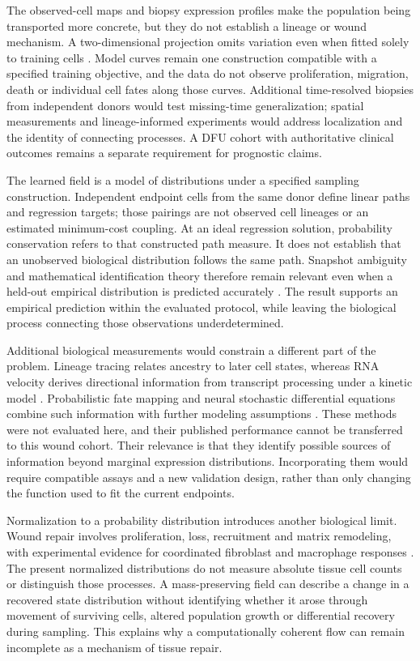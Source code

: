 The observed-cell maps and biopsy expression profiles make the population being transported more concrete, but they do not establish a lineage or wound mechanism. A two-dimensional projection omits variation even when fitted solely to training cells \citep{huang2022visualization}. Model curves remain one construction compatible with a specified training objective, and the data do not observe proliferation, migration, death or individual cell fates along those curves. Additional time-resolved biopsies from independent donors would test missing-time generalization; spatial measurements and lineage-informed experiments would address localization and the identity of connecting processes. A DFU cohort with authoritative clinical outcomes remains a separate requirement for prognostic claims.

The learned field is a model of distributions under a specified sampling construction. Independent endpoint cells from the same donor define linear paths and regression targets; those pairings are not observed cell lineages or an estimated minimum-cost coupling. At an ideal regression solution, probability conservation refers to that constructed path measure. It does not establish that an unobserved biological distribution follows the same path. Snapshot ambiguity and mathematical identification theory therefore remain relevant even when a held-out empirical distribution is predicted accurately \citep{weinreb2018,lavenant2021}. The result supports an empirical prediction within the evaluated protocol, while leaving the biological process connecting those observations underdetermined.

Additional biological measurements would constrain a different part of the problem. Lineage tracing relates ancestry to later cell states, whereas RNA velocity derives directional information from transcript processing under a kinetic model \citep{weinreb2020,lamanno2018,bergen2020}. Probabilistic fate mapping and neural stochastic differential equations combine such information with further modeling assumptions \citep{lange2022,vinyard2025}. These methods were not evaluated here, and their published performance cannot be transferred to this wound cohort. Their relevance is that they identify possible sources of information beyond marginal expression distributions. Incorporating them would require compatible assays and a new validation design, rather than only changing the function used to fit the current endpoints.

Normalization to a probability distribution introduces another biological limit. Wound repair involves proliferation, loss, recruitment and matrix remodeling, with experimental evidence for coordinated fibroblast and macrophage responses \citep{rognoni2018,shook2018}. The present normalized distributions do not measure absolute tissue cell counts or distinguish those processes. A mass-preserving field can describe a change in a recovered state distribution without identifying whether it arose through movement of surviving cells, altered population growth or differential recovery during sampling. This explains why a computationally coherent flow can remain incomplete as a mechanism of tissue repair.

